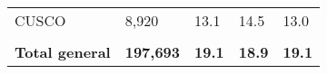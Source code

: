 \begin{tabular}{lllll}
	\cellcolor[HTML]{FF5050}CUSCO                                  & 8,920                                                                 & 13.1                                                                             & 14.5                                                                        & 13.0                                                                                \\
	&                                                                       &                                                                                  &                                                                             &                                                                                     \\
	\rowcolor[HTML]{DDEBF7} 
	\textbf{Total   general}                                       & \textbf{197,693}                                                      & \textbf{19.1}                                                                    & \textbf{18.9}                                                               & \textbf{19.1}                                                                      
\end{tabular}